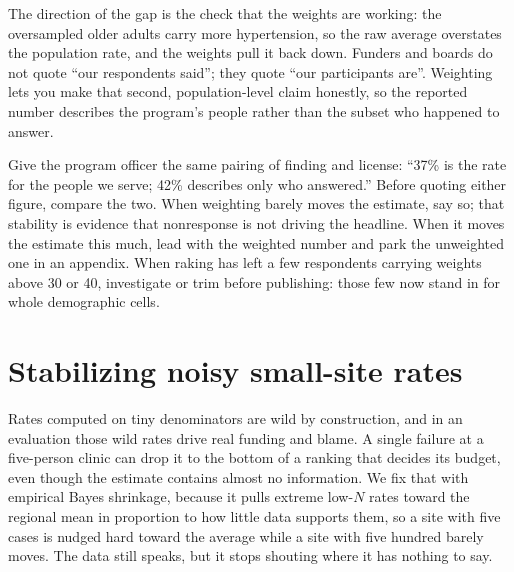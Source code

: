 \documentclass[
    a4paper,
    fontsize=10pt,
    twoside=true,
    numbers=noenddot,
]{kaobook}
\begin{document}
The direction of the gap is the check that the weights are working: the oversampled older adults carry more hypertension, so the raw average overstates the population rate, and the weights pull it back down. Funders and boards do not quote \enquote{our respondents said}; they quote \enquote{our participants are}. Weighting lets you make that second, population-level claim honestly, so the reported number describes the program's people rather than the subset who happened to answer.

Give the program officer the same pairing of finding and license: \enquote{37\% is the rate for the people we serve; 42\% describes only who answered.} Before quoting either figure, compare the two. When weighting barely moves the estimate, say so; that stability is evidence that nonresponse is not driving the headline. When it moves the estimate this much, lead with the weighted number and park the unweighted one in an appendix. When raking has left a few respondents carrying weights above 30 or 40, investigate or trim before publishing: those few now stand in for whole demographic cells.

\section{Stabilizing noisy small-site rates}\label{sec:shrink}
Rates computed on tiny denominators are wild by construction, and in an evaluation those wild rates drive real funding and blame. A single failure at a five-person clinic can drop it to the bottom of a ranking that decides its budget, even though the estimate contains almost no information. We fix that with empirical Bayes shrinkage, because it pulls extreme low-$N$ rates toward the regional mean in proportion to how little data supports them, so a site with five cases is nudged hard toward the average while a site with five hundred barely moves. The data still speaks, but it stops shouting where it has nothing to say.
\end{document}
